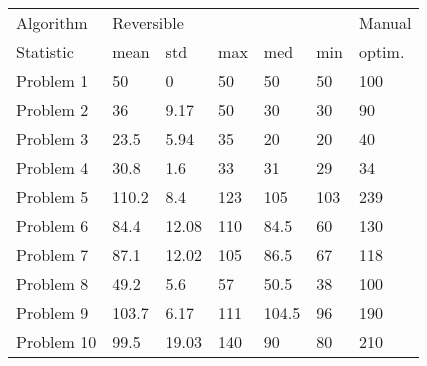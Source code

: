 \begin{tabular}{lllllll}
\toprule
Algorithm & \multicolumn{5}{l}{Reversible} & Manual \\
Statistic &       mean &    std &  max &    med &  min & optim. \\
\midrule
Problem 1  &         50 &      0 &   50 &     50 &   50 &    100 \\
Problem 2  &         36 &   9.17 &   50 &     30 &   30 &     90 \\
Problem 3  &       23.5 &   5.94 &   35 &     20 &   20 &     40 \\
Problem 4  &       30.8 &    1.6 &   33 &     31 &   29 &     34 \\
Problem 5  &      110.2 &    8.4 &  123 &    105 &  103 &    239 \\
Problem 6  &       84.4 &  12.08 &  110 &   84.5 &   60 &    130 \\
Problem 7  &       87.1 &  12.02 &  105 &   86.5 &   67 &    118 \\
Problem 8  &       49.2 &    5.6 &   57 &   50.5 &   38 &    100 \\
Problem 9  &      103.7 &   6.17 &  111 &  104.5 &   96 &    190 \\
Problem 10 &       99.5 &  19.03 &  140 &     90 &   80 &    210 \\
\bottomrule
\end{tabular}

